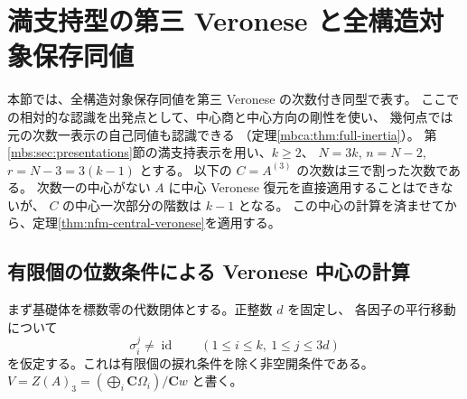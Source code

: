 \section{満支持型の第三 Veronese と全構造対象保存同値}
\label{mbv:sec:veronese}

本節では、全構造対象保存同値を第三 Veronese の次数付き同型で表す。
ここでの相対的な認識を出発点として、中心商と中心方向の剛性を使い、
幾何点では元の次数一表示の自己同値も認識できる
（定理\ref{mbca:thm:full-inertia}）。
第\ref{mbs:sec:presentations}節の満支持表示を用い、$k\geq2$、
$N=3k$, $n=N-2$, $r=N-3=3(k-1)$ とする。
以下の $C=A^{(3)}$ の次数は三で割った次数である。
次数一の中心がない $A$ に中心 Veronese 復元を直接適用することはできないが、
$C$ の中心一次部分の階数は $k-1$ となる。
この中心の計算を済ませてから、定理\ref{thm:nfm-central-veronese}を適用する。

\subsection{有限個の位数条件による Veronese 中心の計算}

まず基礎体を標数零の代数閉体とする。正整数 $d$ を固定し、
各因子の平行移動について
\begin{equation}\label{mbv:eq:order-bound}
 \sigma_i^j\ne\operatorname{id}
 \qquad(1\leq i\leq k,\ 1\leq j\leq3d)
\end{equation}
を仮定する。これは有限個の捩れ条件を除く非空開条件である。
$V=Z(A)_3=(\bigoplus_i\mathbf C\Omega_i)/\mathbf Cw$ と書く。

